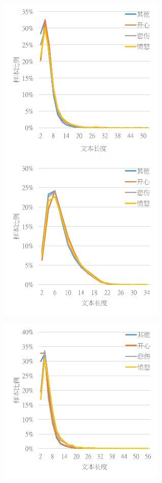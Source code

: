 \begin{figure}[h]
  \centering%

  \begin{minipage}{\linewidth}

    {\includegraphics[height=8cm]{img/semeval2019_task3_train_0_class_len.png}}%
      {\includegraphics[height=8cm]{img/semeval2019_task3_train_1_class_len.png}}

  \end{minipage}
  \vspace{0.5cm} 

      {\includegraphics[height=8cm]{img/semeval2019_task3_train_2_class_len.png}}


\end{figure}
